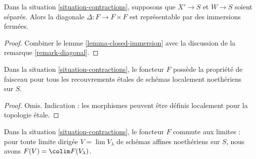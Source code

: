 \begin{lemma}
\label{lemma-diagonal-contractions}
Dans la situation \ref{situation-contractions}, supposons que $X' \to S$ et
$W \to S$ soient séparés. Alors la diagonale $\Delta : F \to F \times F$ est
représentable par des immersions fermées.
\end{lemma}

\begin{proof}
Combiner le lemme \ref{lemma-closed-immersion} avec la discussion de la
remarque \ref{remark-diagonal}.
\end{proof}

\begin{lemma}
\label{lemma-sheaf}
Dans la situation \ref{situation-contractions}, le foncteur $F$ possède la
propriété de faisceau pour tous les recouvrements \'etales de schémas
localement noethériens sur $S$.
\end{lemma}

\begin{proof}
Omis. Indication : les morphismes peuvent être définis localement pour la
topologie \'etale.
\end{proof}

\begin{lemma}
\label{lemma-limit-preserving}
Dans la situation \ref{situation-contractions}, le foncteur $F$ commute aux
limites : pour toute limite dirigée $V = \lim V_\lambda$ de schémas affines
noethériens sur $S$, nous avons $F(V) = \colim F(V_\lambda)$.
\end{lemma}

